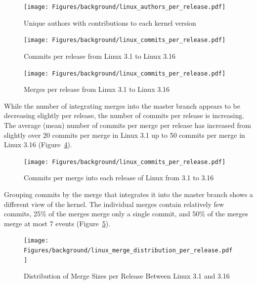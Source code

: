 \begin{figure}[htpb]
  \centering
  \texttt{[image: Figures/background/linux\_authors\_per\_release.pdf]}
  \caption{Unique authors with contributions to each kernel version}
  \label{fig:linux_authors_per_release}
\end{figure}

\begin{figure}[htpb]
  \centering
  \texttt{[image: Figures/background/linux\_commits\_per\_release.pdf]}
  \caption{Commits per release from Linux 3.1 to Linux 3.16}
  \label{fig:linux_commits_per_release}
\end{figure}

\begin{figure}[htpb]
  \centering
  \texttt{[image: Figures/background/linux\_commits\_per\_release.pdf]}
  \caption{Merges per release from Linux 3.1 to Linux 3.16}
  \label{fig:linux_merges_per_release}
\end{figure}

While the number of integrating merges into the master branch appears to
be decreasing slightly per release, the number of commits per release is
increasing. The average (mean) number of commits per merge per release
has increased from slightly over 20 commits per merge in Linux 3.1 up to
50 commits per merge in Linux 3.16
(Figure~\ref{fig:linux_commits_per_merge_per_release}).

\begin{figure}[htpb]
  \centering
  \texttt{[image: Figures/background/linux\_commits\_per\_release.pdf]}
  \caption{Commits per merge into each release of Linux from 3.1 to 3.16
    }
  \label{fig:linux_commits_per_merge_per_release}
\end{figure}

Grouping commits by the merge that integrates it into the master branch
shows a different view of the kernel. The individual merges contain
relatively few commits, 25\% of the merges merge only a single commit,
and 50\% of the merges merge at most 7 events
(Figure~\ref{fig:linux_merge_distribution_per_release}).

\begin{figure}[htpb]
  \centering
  \texttt{[image: Figures/background/linux\_merge\_distribution\_per\_release.pdf]}
  \caption{Distribution of Merge Sizes per Release Between Linux 3.1 and
  3.16}
  \label{fig:linux_merge_distribution_per_release}
\end{figure}

